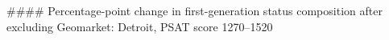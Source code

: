 #### Percentage-point change in first-generation status composition after excluding Geomarket: Detroit, PSAT score 1270–1520
